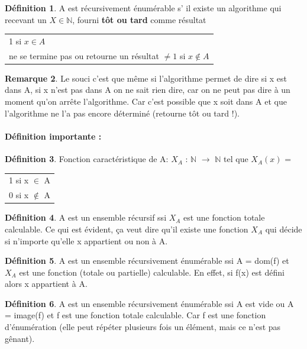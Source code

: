 \documentclass[11pt,a4paper]{article}
\newcommand{\N}{\mathbb{N}}
\theoremstyle{definition}
\newtheorem{mydef}{Définition}
\newtheorem{myrem}[mydef]{Remarque}
\begin{document}
\begin{mydef}
	A est récursivement énumérable s’ il existe un algorithme qui recevant
	un $X\in \N$, fourni \textbf{tôt ou tard} comme résultat
	\begin{tabular}{l}
		1 si $x\in A$\\
		 ne se termine pas ou retourne un résultat $\neq1$ si
		 $x\notin A$\\
	\end{tabular}
\end{mydef}

\begin{myrem}
		Le souci c'est que même si l'algorithme permet de dire si x est dans A, si x
		n'est pas dans A on ne sait rien dire, car on ne peut pas dire à un moment qu'on
		arrête l'algorithme. Car c'est possible que x soit dans A et que l'algorithme ne
		l'a pas encore déterminé (retourne tôt ou tard !).
\end{myrem}

\paragraph{Définition importante :}
\label{par:d_finition_importante}

\begin{mydef}
	Fonction caractéristique de A:
	$X_A$ : $\N$ $\rightarrow$ $\N$ tel que $X_A(x)$ =
\begin{tabular}{l}
	1 si x $\in$ A \\	
	0 si x $\notin$ A 
\end{tabular}
\end{mydef}

\begin{mydef}
	A est un ensemble récursif ssi $X_A$ est une fonction totale calculable. Ce qui
	est évident, ça veut dire qu'il existe une fonction $X_A$ qui décide si n'importe
	qu'elle x appartient ou non à A.\\
\end{mydef}

\begin{mydef}
	A est un ensemble récursivement énumérable ssi A = dom(f) et $X_A$ est une 
	fonction (totale ou partielle) calculable. En effet, si f(x) est défini alors
	x appartient à A.\\
\end{mydef}

\begin{mydef}
	A est un ensemble récursivement énumérable ssi A est vide ou A = image(f) et f
	est une fonction totale calculable. Car f est une fonction d'énumération (elle
	peut répéter plusieurs fois un élément, mais ce n'est pas gênant).\\
\end{mydef}
\end{document}

